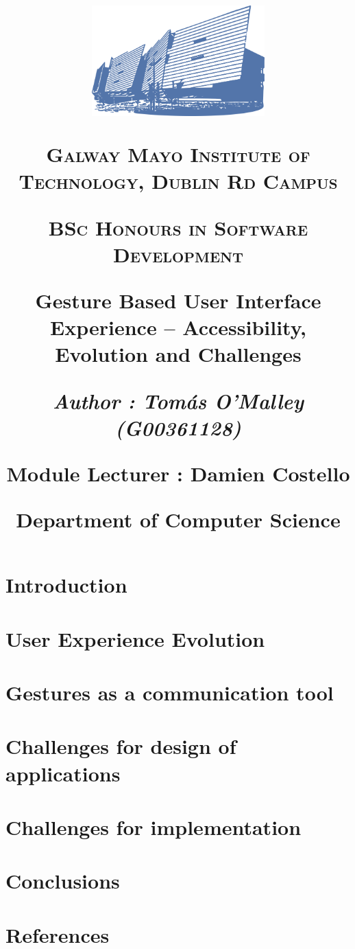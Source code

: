 \documentclass[11pt,twoside]{report}
\title{



{\includegraphics[width=0.5\textwidth]{gmit.png}}


        \vspace{0.25cm}
        {\scshape\LARGE Galway Mayo Institute of Technology, Dublin Rd Campus \par}
        \vspace{0.25cm}
        {\scshape\Large BSc  Honours in Software Development \par}
        \vspace{0.5cm}




        {\Large\bfseries  Gesture Based User Interface Experience –
Accessibility, Evolution and Challenges\par}
        
        \vspace{0.5cm}
        {\Large\itshape  Author : Tomás O'Malley (G00361128) \par}
        \vspace{0.25cm}

\vspace{1cm}
Module Lecturer : Damien Costello \par
Department of Computer Science \par
\vspace{1.5cm}
\large
}
\begin{document}
\maketitle 


\tableofcontents
\chapter{ Introduction }




\chapter{User Experience Evolution}


\chapter{Gestures as a communication tool }


\chapter{Challenges for design of applications}


\chapter{Challenges for implementation}


\chapter{Conclusions}


\chapter{References}

\end{document}
